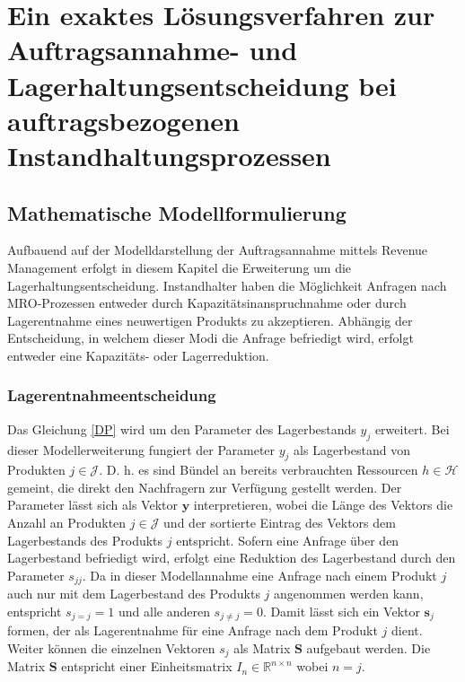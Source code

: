 \chapter{Ein exaktes Lösungsverfahren zur Auftragsannahme- und Lagerhaltungsentscheidung bei auftragsbezogenen Instandhaltungsprozessen}
\setcounter{footnote}{7}

\section{Mathematische Modellformulierung}

Aufbauend auf der Modelldarstellung der Auftragsannahme mittels Revenue Management erfolgt in diesem Kapitel die Erweiterung um die Lagerhaltungsentscheidung. Instandhalter haben die Möglichkeit Anfragen nach MRO-Prozessen entweder durch Kapazitätsinanspruchnahme oder durch Lagerentnahme eines neuwertigen Produkts zu akzeptieren. Abhängig der Entscheidung, in welchem dieser Modi die Anfrage befriedigt wird, erfolgt entweder eine Kapazitäts- oder Lagerreduktion.

\subsection{Lagerentnahmeentscheidung}

Das Gleichung \eqref{DP} wird um den Parameter des Lagerbestands $y_{j}$ erweitert. Bei dieser Modellerweiterung fungiert der Parameter $y_{j}$ als Lagerbestand von Produkten $j\in\mathcal{J}$. D. h. es sind Bündel an bereits verbrauchten Ressourcen $h\in\mathcal{H}$ gemeint, die direkt den Nachfragern zur Verfügung gestellt werden. Der Parameter lässt sich als Vektor $\textbf{y}$ interpretieren, wobei die Länge des Vektors die Anzahl an Produkten $j\in\mathcal{J}$ und der sortierte Eintrag des Vektors dem Lagerbestands des Produkts $j$ entspricht. Sofern eine Anfrage über den Lagerbestand befriedigt wird, erfolgt eine Reduktion des Lagerbestand durch den Parameter $s_{jj}$. Da in dieser Modellannahme eine Anfrage nach einem Produkt $j$ auch nur mit dem Lagerbestand des Produkts $j$ angenommen werden kann, entspricht $s_{j=j}=1$ und alle anderen $s_{j\neq j}=0$. Damit lässt sich ein Vektor $\textbf{s}_j$ formen, der als Lagerentnahme für eine Anfrage nach dem Produkt $j$ dient. Weiter können die einzelnen Vektoren $s_{j}$ als Matrix $\textbf{S}$ aufgebaut werden. Die Matrix $\textbf{S}$ entspricht einer Einheitsmatrix $I_{n}\in\mathbb{R}^{n\times n}$ wobei $n=j$.

